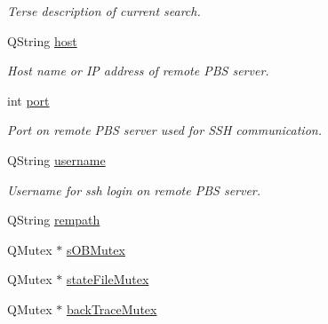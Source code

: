 \begin{DoxyCompactItemize}
\begin{DoxyCompactList}\small\item\em Terse description of current search. \end{DoxyCompactList}\item 
\hypertarget{classGlobalSearch_1_1OptBase_a450b588c2994270e8e053365f094fb52}{Q\-String \hyperlink{classGlobalSearch_1_1OptBase_a450b588c2994270e8e053365f094fb52}{host}}\label{classGlobalSearch_1_1OptBase_a450b588c2994270e8e053365f094fb52}

\begin{DoxyCompactList}\small\item\em Host name or I\-P address of remote P\-B\-S server. \end{DoxyCompactList}\item 
\hypertarget{classGlobalSearch_1_1OptBase_aa07a4fe47df0f8d4fface200fdde4dee}{int \hyperlink{classGlobalSearch_1_1OptBase_aa07a4fe47df0f8d4fface200fdde4dee}{port}}\label{classGlobalSearch_1_1OptBase_aa07a4fe47df0f8d4fface200fdde4dee}

\begin{DoxyCompactList}\small\item\em Port on remote P\-B\-S server used for S\-S\-H communication. \end{DoxyCompactList}\item 
\hypertarget{classGlobalSearch_1_1OptBase_a75c9102491957d00fd6bd4da9329c2ed}{Q\-String \hyperlink{classGlobalSearch_1_1OptBase_a75c9102491957d00fd6bd4da9329c2ed}{username}}\label{classGlobalSearch_1_1OptBase_a75c9102491957d00fd6bd4da9329c2ed}

\begin{DoxyCompactList}\small\item\em Username for ssh login on remote P\-B\-S server. \end{DoxyCompactList}\item 
Q\-String \hyperlink{classGlobalSearch_1_1OptBase_a777ad7fbedbb76f522e02ca73883ab7d}{rempath}
\item 
Q\-Mutex $\ast$ \hyperlink{classGlobalSearch_1_1OptBase_a86c1868458b6f8430dc366c009c9deb5}{s\-O\-B\-Mutex}
\item 
Q\-Mutex $\ast$ \hyperlink{classGlobalSearch_1_1OptBase_af0df28a179c8a89022f4887c18761956}{state\-File\-Mutex}
\item 
\hypertarget{classGlobalSearch_1_1OptBase_aa74d5687ec2969388db9c4a87adbfce5}{Q\-Mutex $\ast$ \hyperlink{classGlobalSearch_1_1OptBase_aa74d5687ec2969388db9c4a87adbfce5}{back\-Trace\-Mutex}}\label{classGlobalSearch_1_1OptBase_aa74d5687ec2969388db9c4a87adbfce5}


\end{DoxyCompactItemize}
